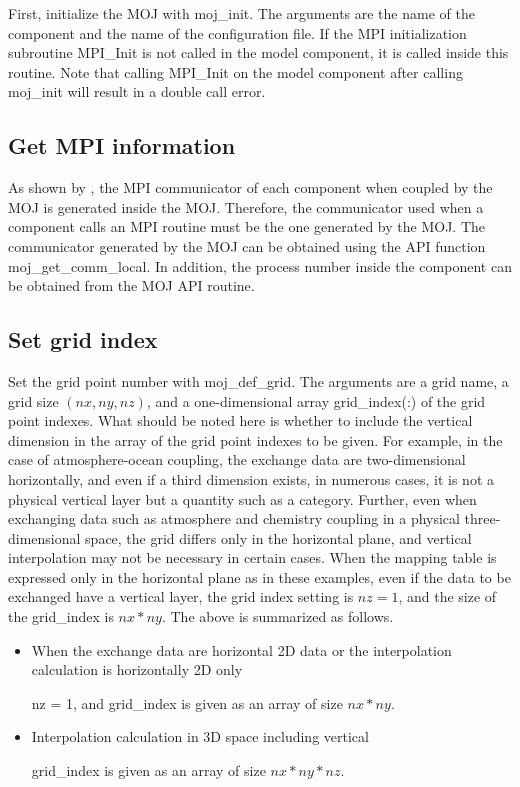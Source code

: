 First, initialize the MOJ with moj\_init. The arguments are the name of
the component and the name of the configuration file. If the MPI
initialization subroutine MPI\_Init is not called in the model
component, it is called inside this routine. Note that calling MPI\_Init
on the model component after calling moj\_init will result in a double
call error.

\hypertarget{get-mpi-information}{%
\subsection{Get MPI information}\label{get-mpi-information}}

As shown by , the MPI communicator of each component when coupled by the
MOJ is generated inside the MOJ. Therefore, the communicator used when a
component calls an MPI routine must be the one generated by the MOJ. The
communicator generated by the MOJ can be obtained using the API function
moj\_get\_comm\_local. In addition, the process number inside the
component can be obtained from the MOJ API routine.

\hypertarget{set-grid-index}{%
\subsection{Set grid index}\label{set-grid-index}}

Set the grid point number with moj\_def\_grid. The arguments are a grid
name, a grid size \((nx, ny, nz)\), and a one-dimensional array
grid\_index(:) of the grid point indexes. What should be noted here is
whether to include the vertical dimension in the array of the grid point
indexes to be given. For example, in the case of atmosphere-ocean
coupling, the exchange data are two-dimensional horizontally, and even
if a third dimension exists, in numerous cases, it is not a physical
vertical layer but a quantity such as a category. Further, even when
exchanging data such as atmosphere and chemistry coupling in a physical
three-dimensional space, the grid differs only in the horizontal plane,
and vertical interpolation may not be necessary in certain cases. When
the mapping table is expressed only in the horizontal plane as in these
examples, even if the data to be exchanged have a vertical layer, the
grid index setting is \(nz = 1\), and the size of the grid\_index is
\(nx *ny\). The above is summarized as follows.

\begin{itemize}
\item
  When the exchange data are horizontal 2D data or the interpolation
  calculation is horizontally 2D only

  nz = 1, and grid\_index is given as an array of size \(nx * ny\).
\item
  Interpolation calculation in 3D space including vertical

  grid\_index is given as an array of size \(nx * ny * nz\).
\end{itemize}

